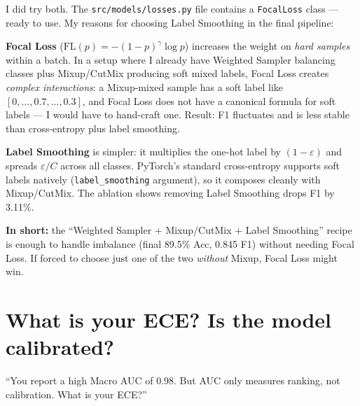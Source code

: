 \documentclass[11pt,a4paper]{article}
\begin{document}
\begin{answer}
I did try both. The \texttt{src/models/losses.py} file contains a \texttt{FocalLoss} class --- ready to use. My reasons for choosing Label Smoothing in the final pipeline:

\textbf{Focal Loss} ($\mathrm{FL}(p) = -(1-p)^\gamma \log p$) increases the weight on \textit{hard samples} within a batch. In a setup where I already have Weighted Sampler balancing classes plus Mixup/CutMix producing soft mixed labels, Focal Loss creates \textit{complex interactions}: a Mixup-mixed sample has a soft label like $[0, ..., 0.7, ..., 0.3]$, and Focal Loss does not have a canonical formula for soft labels --- I would have to hand-craft one. Result: F1 fluctuates and is less stable than cross-entropy plus label smoothing.

\textbf{Label Smoothing} is simpler: it multiplies the one-hot label by $(1-\varepsilon)$ and spreads $\varepsilon/C$ across all classes. PyTorch's standard cross-entropy supports soft labels natively (\texttt{label\_smoothing} argument), so it composes cleanly with Mixup/CutMix. The ablation shows removing Label Smoothing drops F1 by 3.11\%.

\textbf{In short:} the ``Weighted Sampler + Mixup/CutMix + Label Smoothing'' recipe is enough to handle imbalance (final 89.5\% Acc, 0.845 F1) without needing Focal Loss. If forced to choose just one of the two \textit{without} Mixup, Focal Loss might win.
\end{answer}

\section{What is your ECE? Is the model calibrated?}

\begin{question}
``You report a high Macro AUC of 0.98. But AUC only measures ranking, not calibration. What is your ECE?''
\end{question}
\end{document}
